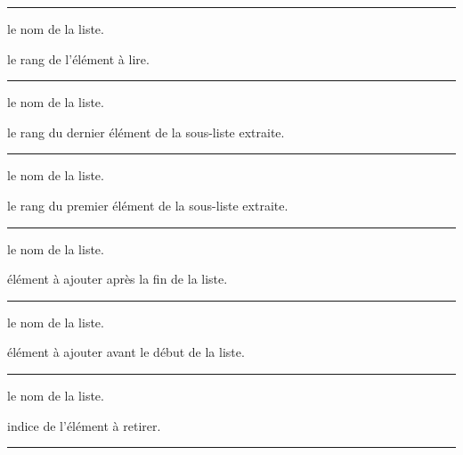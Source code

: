 \documentclass[12pt,a4paper]{article}
\theoremstyle{definition}
\newcommand\separation{
    \medskip
    \hfill\rule{0.5\textwidth}{0.75pt}\hfill
    \medskip
}
\begin{document}


\separation



 le nom de la liste.

 le rang de l'élément à lire.




\separation



 le nom de la liste.

 le rang du dernier élément de la sous-liste extraite.




\separation



 le nom de la liste.

 le rang du premier élément de la sous-liste extraite.




\separation





 le nom de la liste.

 élément à ajouter après la fin de la liste.




\separation





 le nom de la liste.

 élément à ajouter avant le début de la liste.




\separation




 le nom de la liste.

 indice de l'élément à retirer.




\separation


\end{document}
